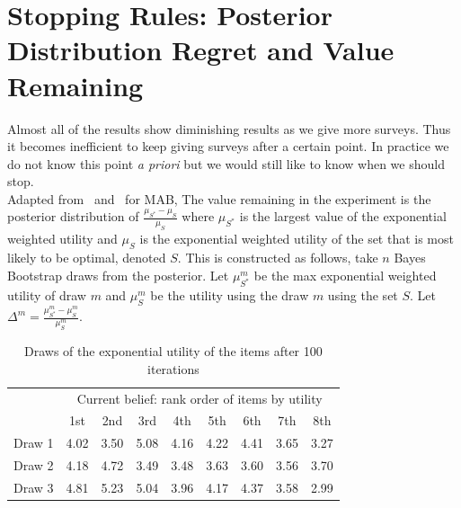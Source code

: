 \documentclass[nonblindrev]{informs3}
\begin{document}
\section{Stopping Rules: Posterior Distribution Regret and Value Remaining}
Almost all of the results show diminishing results as we give more surveys. Thus it becomes inefficient to keep giving surveys after a certain point. In practice we do not know this point \textit{a priori} but we would still like to know when we should stop.\\
Adapted from~\cite{scott2015multi} and~\cite{scott2010modern} for MAB, The value remaining in the experiment is the posterior distribution of $\frac{\mu_{S^*}-\mu_{S}}{\mu_{S}}$ where $\mu_{S^*}$ is the largest value of the exponential weighted utility and $\mu_{S}$ is the exponential weighted utility of the set that is most likely to be optimal, denoted $S$. This is constructed as follows, take $n$ Bayes Bootstrap draws from the posterior. Let $\mu_{S^*}^{m}$ be the max exponential weighted utility of draw $m$ and $\mu_{S}^{m}$ be the utility using the draw $m$ using the set $S$. Let $\Delta^{m}=\frac{\mu^m_{S^*}-\mu^m_{S}}{\mu^m_{S}}$.\\
\begin{table}
\begin{center}
\begin{tabular}{l | c c c c c c c c}
& \multicolumn{8}{c}{Current belief: rank order of items by utility} \\
& 1st &  2nd  &  3rd  &  4th &  5th & 6th & 7th &  8th \\
\hline
Draw 1 & 4.02 &  3.50 &  5.08 & 4.16&  4.22 & 4.41 & 3.65 &  3.27 \\
Draw 2 &4.18 & 4.72 & 3.49 & 3.48 & 3.63 & 3.60 & 3.56 &  3.70 \\
Draw 3 &4.81 & 5.23 & 5.04 &  3.96 &  4.17 & 4.37 &  3.58 & 2.99 \\ 
\end{tabular}
\end{center}
\caption{Draws of the exponential utility of the items after 100 iterations}
\label{table:data}
\end{table}
\end{document}
